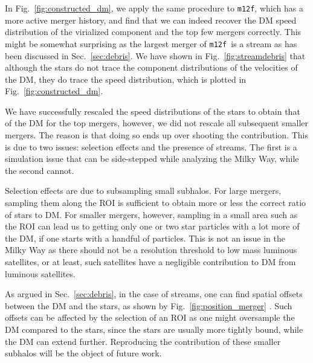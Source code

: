 \documentclass[twocolumn,preprintnumbers]{aastex6}
\DeclareRobustCommand{\Sec}[1]{Sec.~\ref{#1}}
\DeclareRobustCommand{\Fig}[1]{Fig.~\ref{#1}}
\newcommand{\mf}{\texttt{m12f}}
\begin{document}
In \Fig{fig:constructed_dm}, we apply the same procedure to \mf, which has a more active merger history, and find that we can indeed recover the DM speed distribution of the virialized component and the top few mergers correctly. This might be somewhat surprising as the largest merger of \mf~is a stream as has been discussed in \Sec{sec:debris}. We have shown in \Fig{fig:streamdebris} that although the stars do not trace the component distributions of the velocities of the DM, they do trace the speed distribution, which is plotted in  \Fig{fig:constructed_dm}. 

We have successfully rescaled the speed distributions of the stars to obtain that of the DM for the top mergers, however, we did not rescale all subsequent smaller mergers. The reason is that doing so ends up over shooting the contribution. This is due to two issues: selection effects and the presence of streams. The first is a simulation issue that can be side-stepped while analyzing the Milky Way, while the second cannot. 

Selection effects are due to subsampling small subhalos. For large mergers, sampling them along the ROI is sufficient to obtain more or less the correct ratio of stars to DM. For smaller mergers, however, sampling in a small area such as the ROI can lead us to getting only one or two star particles with a lot more of the DM, if one starts with a handful of particles. This is not an issue in the Milky Way as there should not be a resolution threshold to low mass luminous satellites, or at least, such satellites have a negligible contribution to DM from luminous satellites.

As argued in \Sec{sec:debris}, in the case of streams, one can find spatial offsets between the DM and the stars, as shown by \Fig{fig:position_merger} . Such offsets can be affected by the selection of an ROI as one might oversample the DM compared to the stars, since the stars are usually more tightly bound, while the DM can extend further.  Reproducing the contribution of these smaller subhalos will be the object of future work.

\end{document}
